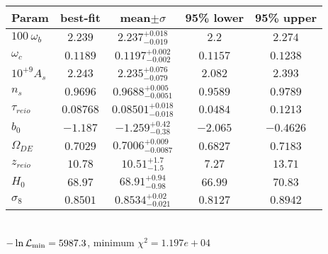 \begin{tabular}{|l|c|c|c|c|} 
 \hline 
Param & best-fit & mean$\pm\sigma$ & 95\% lower & 95\% upper \\ \hline 
$100~\omega_{b }$ &$2.239$ & $2.237_{-0.019}^{+0.018}$ & $2.2$ & $2.274$ \\ 
$\omega_c$ &$0.1189$ & $0.1197_{-0.002}^{+0.002}$ & $0.1157$ & $0.1238$ \\ 
$10^{+9}A_{s }$ &$2.243$ & $2.235_{-0.079}^{+0.076}$ & $2.082$ & $2.393$ \\ 
$n_{s }$ &$0.9696$ & $0.9688_{-0.0051}^{+0.005}$ & $0.9589$ & $0.9789$ \\ 
$\tau_{reio }$ &$0.08768$ & $0.08501_{-0.018}^{+0.018}$ & $0.0484$ & $0.1213$ \\ 
$b_{0 }$ &$-1.187$ & $-1.259_{-0.38}^{+0.42}$ & $-2.065$ & $-0.4626$ \\ 
$\Omega_{DE}$ &$0.7029$ & $0.7006_{-0.0087}^{+0.009}$ & $0.6827$ & $0.7183$ \\ 
$z_{reio }$ &$10.78$ & $10.51_{-1.5}^{+1.7}$ & $7.27$ & $13.71$ \\ 
$H_{0 }$ &$68.97$ & $68.91_{-0.98}^{+0.94}$ & $66.99$ & $70.83$ \\ 
$\sigma_8$ &$0.8501$ & $0.8534_{-0.021}^{+0.02}$ & $0.8127$ & $0.8942$ \\ 
\hline 
 \end{tabular} \\ 
$-\ln{\cal L}_\mathrm{min} =5987.3$, minimum $\chi^2=1.197e+04$ \\ 
